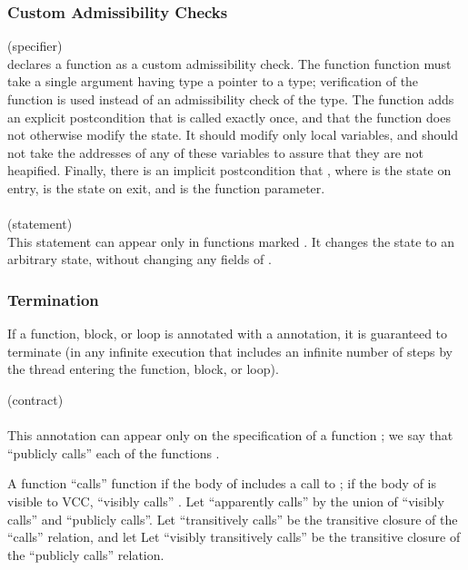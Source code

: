 \documentclass[preprint,nocopyrightspace]{sigplanconf}
\begin{document}
{{{{\begin{VCC}
\subsubsection{Custom Admissibility Checks}
 (specifier)\\
 declares a function as a custom admissibility check. The function
function must take a single argument having type a pointer to a  type;
verification of the function is used instead of an admissibility check
of the  type. The function adds an explicit postcondition
that   is called exactly once, and that the
function does not otherwise modify the state. It should modify only
local variables, and should not take the addresses of any of these
variables to assure that they are not heapified. Finally, there is an
implicit postcondition that , where  is
the state on entry,  is the state on exit, and  is the
function parameter.
\\\\
 (statement)\\
This statement can appear only in functions
marked . It changes the state to an arbitrary
\vcc{\legal} state, without changing any fields of .

\subsubsection{Termination}
If a function, block, or loop is annotated with a 
annotation, it is guaranteed to terminate (in any infinite execution
that includes an infinite number of steps by the thread entering the
function, block, or loop).

 (contract)\\
\\ 
This annotation can appear only on the specification of a
function ; we say that  ``publicly calls'' each of the
functions . 

A function  ``calls'' function  if the body of 
includes a call to ; if the body of  is visible to VCC,
 ``visibly calls'' . Let ``apparently calls'' by the
union of ``visibly calls'' and ``publicly calls''. 
Let ``transitively calls'' be the
transitive closure of the ``calls'' relation, and let Let ``visibly
transitively calls'' be the transitive closure of the ``publicly
calls'' relation. 


\end{VCC}}}}}
\end{document}
